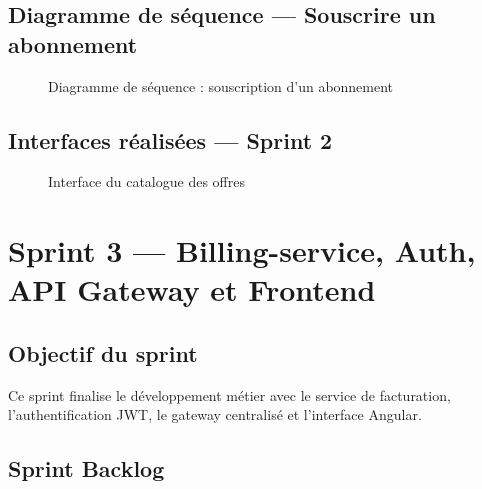 \subsection{Diagramme de séquence --- Souscrire un abonnement}

\begin{figure}[H]
    \centering
    \caption{Diagramme de séquence : souscription d'un abonnement}
    \label{fig:seq_subscribe}
\end{figure}

\subsection{Interfaces réalisées --- Sprint 2}
\begin{figure}[H]
    \centering
    \caption{Interface du catalogue des offres}
    \label{fig:ui_catalog}
\end{figure}

\section{Sprint 3 --- Billing-service, Auth, API Gateway et Frontend}

\subsection{Objectif du sprint}
Ce sprint finalise le développement métier avec le service de facturation, l'authentification JWT, le gateway centralisé et l'interface Angular.

\subsection{Sprint Backlog}

